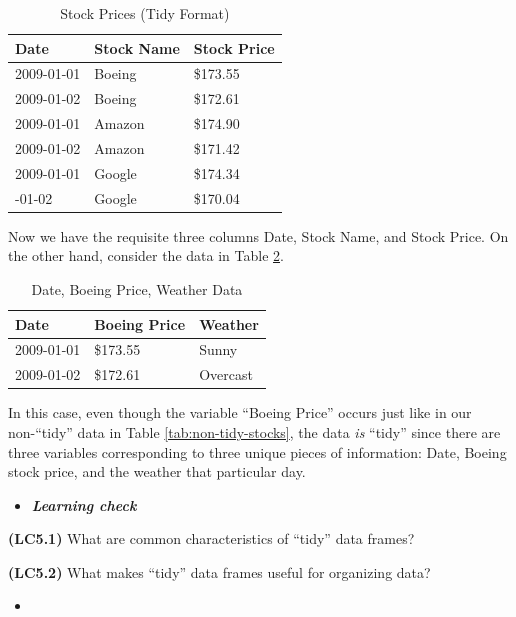\documentclass[12pt, krantz2,]{krantz}
\newenvironment{rmdblock}[1]
  {\begin{shaded*}
  \begin{itemize}
  \renewcommand{\labelitemi}{
    \raisebox{-.7\height}[0pt][0pt]{
    }
  }
  \item
  }
  {
  \end{itemize}
  \end{shaded*}
  }
\newenvironment{learncheck}
  {\begin{rmdblock}{warning}}
  {\end{rmdblock}}
\begin{document}
\begin{table}[H]

\caption{\label{tab:tidy-stocks}Stock Prices (Tidy Format)}
\centering
\fontsize{10}{12}\selectfont
\begin{tabular}{lll}
\toprule
Date & Stock Name & Stock Price\\
\midrule
2009-01-01 & Boeing & \$173.55\\
2009-01-02 & Boeing & \$172.61\\
2009-01-01 & Amazon & \$174.90\\
2009-01-02 & Amazon & \$171.42\\
2009-01-01 & Google & \$174.34\\
\addlinespace
2009-01-02 & Google & \$170.04\\
\bottomrule
\end{tabular}
\end{table}

Now we have the requisite three columns Date, Stock Name, and Stock Price. On the other hand, consider the data in Table \ref{tab:tidy-stocks-2}.

\begin{table}[H]

\caption{\label{tab:tidy-stocks-2}Date, Boeing Price, Weather Data}
\centering
\fontsize{10}{12}\selectfont
\begin{tabular}{lll}
\toprule
Date & Boeing Price & Weather\\
\midrule
2009-01-01 & \$173.55 & Sunny\\
2009-01-02 & \$172.61 & Overcast\\
\bottomrule
\end{tabular}
\end{table}

In this case, even though the variable ``Boeing Price'' occurs just like in our non-``tidy'' data in Table \ref{tab:non-tidy-stocks}, the data \emph{is} ``tidy'' since there are three variables corresponding to three unique pieces of information: Date, Boeing stock price, and the weather that particular day.

\begin{learncheck}
\textbf{\emph{Learning check}}
\end{learncheck}

\textbf{(LC5.1)} What are common characteristics of ``tidy'' data frames?

\textbf{(LC5.2)} What makes ``tidy'' data frames useful for organizing data?

\begin{learncheck}

\end{learncheck}
\end{document}

